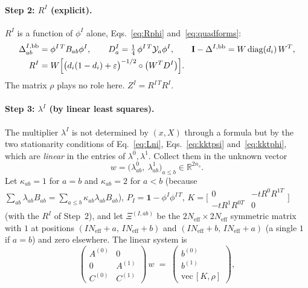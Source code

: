 \documentclass[11pt]{article}
\newcommand{\Neff}{N_{\mathrm{eff}}}
\newcommand{\Ybb}{\Delta^{I,\mathrm{bb}}}
\begin{document}
\paragraph{Step 2: $R^{I}$ (explicit).} $R^I$ is a function of $\phi^I$ alone,
Eqs.~\eqref{eq:Rphi} and~\eqref{eq:quadforms}:
\begin{align}
  \Ybb_{ab}&=\phi^{I\,T}B_{ab}\phi^{I},\qquad
  D^{I}_{a}=\tfrac14\,\phi^{I\,T}\mathcal Y_{a}\phi^{I},\qquad
  \mathbf I-\Ybb=W\,\mathrm{diag}(d_i)\,W^{T},\notag\\
  R^{I}&=W\Bigl[\bigl(d_i(1-d_i)+\varepsilon\bigr)^{-1/2}\circ\bigl(W^{T}D^{I}\bigr)\Bigr].
\end{align}
The matrix $\rho$ plays no role here. $Z^I=R^{I\,T}R^{I}$.

\paragraph{Step 3: $\lambda^{I}$ (by linear least squares).} The multiplier $\lambda^I$ is not
determined by $(x,X)$ through a formula but by the two stationarity conditions of
Eq.~\eqref{eq:Lni}, Eqs.~\eqref{eq:kktpsi} and~\eqref{eq:kktphi}, which are \emph{linear} in
the entries of $\lambda^0,\lambda^1$. Collect them in the unknown vector
\begin{equation}
  w=\bigl(\lambda^{0}_{ab},\ \lambda^{1}_{ab}\bigr)_{a\le b}\in\mathbb R^{2n_s}.
\end{equation}
Let $\kappa_{ab}=1$ for $a=b$ and $\kappa_{ab}=2$ for $a<b$ (because
$\sum_{ab}\lambda_{ab}B_{ab}=\sum_{a\le b}\kappa_{ab}\lambda_{ab}B_{ab}$), $P_I=\mathbf 1-\phi^I\phi^{I\,T}$,
$K=\bigl[\begin{smallmatrix}0&-tR^0R^{1T}\\-tR^1R^{0T}&0\end{smallmatrix}\bigr]$ (with the $R^I$ of Step~2),
and let $\Xi^{(I,ab)}$ be the $2\Neff\times2\Neff$ symmetric matrix with $1$ at positions
$(I\Neff+a,\,I\Neff+b)$ and $(I\Neff+b,\,I\Neff+a)$ (a single $1$ if $a=b$) and zero elsewhere. The linear
system is
\begin{equation}
  \begin{pmatrix}
    A^{(0)} & 0\\
    0 & A^{(1)}\\
    C^{(0)} & C^{(1)}
  \end{pmatrix}\,w
  \;=\;
  \begin{pmatrix} b^{(0)}\\ b^{(1)}\\ \mathrm{vec}\,[K,\rho]\end{pmatrix},
  \label{eq:linsys}
\end{equation}
\end{document}
